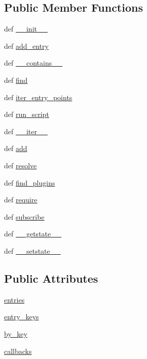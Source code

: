 \subsection*{Public Member Functions}
\begin{DoxyCompactItemize}
\item 
def \hyperlink{classpkg__resources_1_1WorkingSet_a1f545577220d119858296d26b14c4697}{\+\_\+\+\_\+init\+\_\+\+\_\+}
\item 
def \hyperlink{classpkg__resources_1_1WorkingSet_a2e0883159eeeb227bf03090f9b108da3}{add\+\_\+entry}
\item 
def \hyperlink{classpkg__resources_1_1WorkingSet_adefb7abb9488093cadc2f3c49d6dfd2a}{\+\_\+\+\_\+contains\+\_\+\+\_\+}
\item 
def \hyperlink{classpkg__resources_1_1WorkingSet_a2f318d5dae7b8ad72310534e8112b1a1}{find}
\item 
def \hyperlink{classpkg__resources_1_1WorkingSet_a21aca7e355fc8c9feca12d904e8effaa}{iter\+\_\+entry\+\_\+points}
\item 
def \hyperlink{classpkg__resources_1_1WorkingSet_acb6c71ba5f72d8c0f2132c003897acad}{run\+\_\+script}
\item 
def \hyperlink{classpkg__resources_1_1WorkingSet_a26cd228293e1217b2b65bbf6ce232ec4}{\+\_\+\+\_\+iter\+\_\+\+\_\+}
\item 
def \hyperlink{classpkg__resources_1_1WorkingSet_a54f026a318ba47fff827b9340b329b06}{add}
\item 
def \hyperlink{classpkg__resources_1_1WorkingSet_ade010aaf0c128a1756d50bfc924062fa}{resolve}
\item 
def \hyperlink{classpkg__resources_1_1WorkingSet_a10f46dcd85478803db71515978dbf5ef}{find\+\_\+plugins}
\item 
def \hyperlink{classpkg__resources_1_1WorkingSet_a1cd857d822e2d3e70efc60da75268ab3}{require}
\item 
def \hyperlink{classpkg__resources_1_1WorkingSet_ae224edbc0d2da24f9ebf6406bf33556c}{subscribe}
\item 
def \hyperlink{classpkg__resources_1_1WorkingSet_a24bca3d192b807959bf7705035cd4fb6}{\+\_\+\+\_\+getstate\+\_\+\+\_\+}
\item 
def \hyperlink{classpkg__resources_1_1WorkingSet_a0fbfb78016498813d175645fbc862a60}{\+\_\+\+\_\+setstate\+\_\+\+\_\+}
\end{DoxyCompactItemize}
\subsection*{Public Attributes}
\begin{DoxyCompactItemize}
\item 
\hyperlink{classpkg__resources_1_1WorkingSet_aa9a6eb37900163d92183a1e40a0b52f4}{entries}
\item 
\hyperlink{classpkg__resources_1_1WorkingSet_afe054ebd8bc27fe61aa90cecadaa9bad}{entry\+\_\+keys}
\item 
\hyperlink{classpkg__resources_1_1WorkingSet_ac0e359dc968ec95eb2b5aed2988daa36}{by\+\_\+key}
\item 
\hyperlink{classpkg__resources_1_1WorkingSet_a5b68079da017460c2ad13d6514ae55d7}{callbacks}
\end{DoxyCompactItemize}


